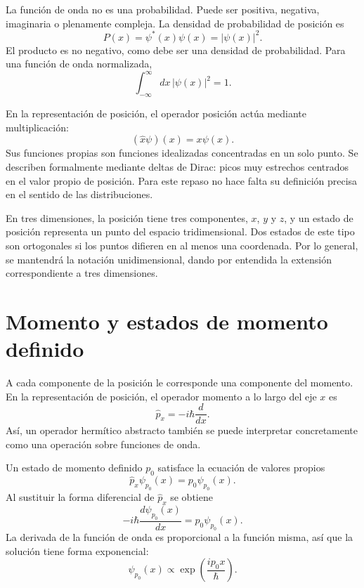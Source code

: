 La función de onda no es una probabilidad. Puede ser positiva, negativa, imaginaria o plenamente compleja. La densidad de probabilidad de posición es
\begin{equation}
P(x)=\psi^*(x)\psi(x)=|\psi(x)|^2.
\end{equation}
El producto es no negativo, como debe ser una densidad de probabilidad. Para una función de onda normalizada,
\begin{equation}
\int_{-\infty}^{\infty}dx\,|\psi(x)|^2=1.
\end{equation}

En la representación de posición, el operador posición actúa mediante multiplicación:
\begin{equation}
(\hat x\psi)(x)=x\psi(x).
\end{equation}
Sus funciones propias son funciones idealizadas concentradas en un solo punto. Se describen formalmente mediante deltas de Dirac: picos muy estrechos centrados en el valor propio de posición. Para este repaso no hace falta su definición precisa en el sentido de las distribuciones.

En tres dimensiones, la posición tiene tres componentes, \(x\), \(y\) y \(z\), y un estado de posición representa un punto del espacio tridimensional. Dos estados de este tipo son ortogonales si los puntos difieren en al menos una coordenada. Por lo general, se mantendrá la notación unidimensional, dando por entendida la extensión correspondiente a tres dimensiones.

\section{Momento y estados de momento definido}

A cada componente de la posición le corresponde una componente del momento. En la representación de posición, el operador momento a lo largo del eje \(x\) es
\begin{equation}
\hat p_x=-i\hbar\frac{d}{dx}.
\end{equation}
Así, un operador hermítico abstracto también se puede interpretar concretamente como una operación sobre funciones de onda.

Un estado de momento definido \(p_0\) satisface la ecuación de valores propios
\begin{equation}
\hat p_x\psi_{p_0}(x)=p_0\psi_{p_0}(x).
\end{equation}
Al sustituir la forma diferencial de \(\hat p_x\) se obtiene
\begin{equation}
-i\hbar\frac{d\psi_{p_0}(x)}{dx}
=p_0\psi_{p_0}(x).
\end{equation}
La derivada de la función de onda es proporcional a la función misma, así que la solución tiene forma exponencial:
\begin{equation}
\psi_{p_0}(x)\propto
\exp\left(\frac{ip_0x}{\hbar}\right).
\end{equation}


